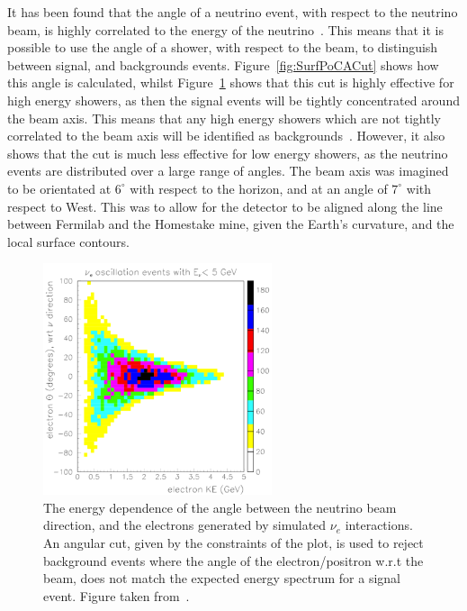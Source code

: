 It has been found that the angle of a neutrino event, with respect to the neutrino beam, is highly correlated to the energy of the neutrino~\citep{barker2012muon}. This means that it is possible to use the angle of a shower, with respect to the beam, to distinguish between signal, and backgrounds events. Figure~\ref{fig:SurfPoCACut} shows how this angle is calculated, whilst Figure~\ref{fig:SurfBeamCut} shows that this cut is highly effective for high energy showers, as then the signal events will be tightly concentrated around the beam axis. This means that any high energy showers which are not tightly correlated to the beam axis will be identified as backgrounds~\citep{LBNE6621}. However, it also shows that the cut is much less effective for low energy showers, as the neutrino events are distributed over a large range of angles. The beam axis was imagined to be orientated at $6^\circ$ with respect to the horizon, and at an angle of $7^\circ$ with respect to West. This was to allow for the detector to be aligned along the line between Fermilab and the Homestake mine, given the Earth's curvature, and the local surface contours. \\

\begin{figure}[h!]
  \centering
  \includegraphics[width=0.6\textwidth]{SurfBeamCut}
  \caption[The energy dependence of the angle between the neutrino beam direction, and the electrons generated by simulated $\nu_{e}$ interactions]
          {The energy dependence of the angle between the neutrino beam direction, and the electrons generated by simulated $\nu_{e}$ interactions. An angular cut, given by the constraints of the plot, is used to reject background events where the angle of the electron/positron w.r.t the beam, does not match the expected energy spectrum for a signal event. Figure taken from~\citep{barker2012muon}.}
  \label{fig:SurfBeamCut}
\end{figure}

